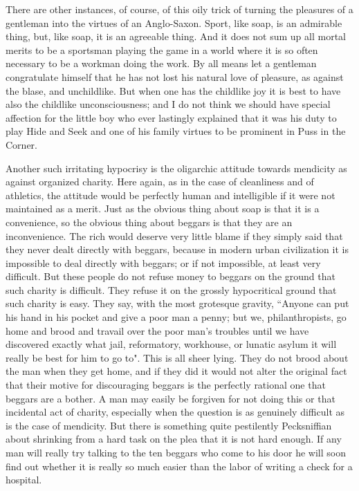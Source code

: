 \documentclass[final,10pt,letterpaper,twocolumn,openany]{book}
\begin{document}
There are other instances, of course, of this oily trick of turning the
pleasures of a gentleman into the virtues of an Anglo-Saxon. Sport, like
soap, is an admirable thing, but, like soap, it is an agreeable thing. And it
does not sum up all mortal merits to be a sportsman playing the game in a
world where it is so often necessary to be a workman doing the work. By
all means let a gentleman congratulate himself that he has not lost his
natural love of pleasure, as against the blase, and unchildlike. But when
one has the childlike joy it is best to have also the childlike
unconsciousness; and I do not think we should have special affection for
the little boy who ever lastingly explained that it was his duty to play Hide
and Seek and one of his family virtues to be prominent in Puss in the
Corner.

Another such irritating hypocrisy is the oligarchic attitude towards
mendicity as against organized charity. Here again, as in the case of
cleanliness and of athletics, the attitude would be perfectly human and
intelligible if it were not maintained as a merit. Just as the obvious thing
about soap is that it is a convenience, so the obvious thing about beggars is
that they are an inconvenience. The rich would deserve very little blame if
they simply said that they never dealt directly with beggars, because in
modern urban civilization it is impossible to deal directly with beggars; or
if not impossible, at least very difficult. But these people do not refuse
money to beggars on the ground that such charity is difficult. They refuse
it on the grossly hypocritical ground that such charity is easy. They say,
with the most grotesque gravity, ``Anyone can put his hand in his pocket
and give a poor man a penny; but we, philanthropists, go home and brood
and travail over the poor man's troubles until we have discovered exactly
what jail, reformatory, workhouse, or lunatic asylum it will really be best
for him to go to". This is all sheer lying. They do not brood about the man
when they get home, and if they did it would not alter the original fact that
their motive for discouraging beggars is the perfectly rational one that
beggars are a bother. A man may easily be forgiven for not doing this or
that incidental act of charity, especially when the question is as genuinely
difficult as is the case of mendicity. But there is something quite
pestilently Pecksniffian about shrinking from a hard task on the plea that it
is not hard enough. If any man will really try talking to the ten beggars
who come to his door he will soon find out whether it is really so much
easier than the labor of writing a check for a hospital.
\end{document}
